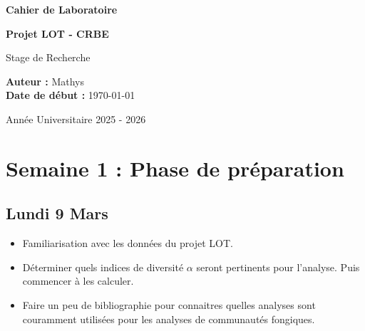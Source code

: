 \documentclass[12pt,a4paper]{report}
\begin{document}
\begin{titlepage}
    \centering
    \vspace*{2cm}
    
    {\Huge \bfseries \textcolor{labblue}{Cahier de Laboratoire}}\par
    \vspace{1.5cm}
    
    {\Large \textbf{Projet LOT - CRBE}}\par
    \vspace{0.5cm}
    {\large Stage de Recherche}\par
    
    \vspace{3cm}
    
    \begin{tcolorbox}[colback=white, colframe=labblue, width=10cm, arc=5mm, center]
        \centering
        \textbf{Auteur :} Mathys\\
        \textbf{Date de début :} \today
    \end{tcolorbox}
    
    \vfill
    
    {\large Année Universitaire 2025 - 2026}\par
\end{titlepage}

\tableofcontents
\newpage


\chapter{Semaine 1 : Phase de préparation}

\section{Lundi 9 Mars}

\begin{objectifs}
    \begin{itemize}
        \item Familiarisation avec les données du projet LOT.
        \item Déterminer quels indices de diversité $\alpha$ seront pertinents pour l'analyse. Puis commencer à les calculer.
        \item Faire un peu de bibliographie pour connaitres quelles analyses sont couramment utilisées pour les analyses de communautés fongiques.
    \end{itemize}
\end{objectifs}
\end{document}
